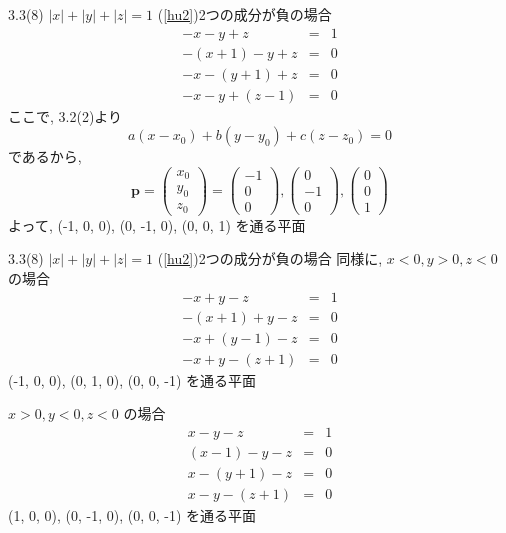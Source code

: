 \documentclass{beamer}
\begin{document}
\begin{frame}{3.3(8) $|x| + |y| + |z|  = 1$ \hspace{5mm} (\ref{hu2})2つの成分が負の場合}
  \begin{eqnarray*}
    -x - y + z &=& 1\\
    -(x+1) - y + z &=& 0\\
    -x - (y+1) + z &=& 0\\
    -x - y + (z-1) &=& 0
  \end{eqnarray*}
  ここで, 3.2(2)より
  \begin{equation*}
    a(x-x_0) + b(y-y_0) + c(z-z_0) = 0
  \end{equation*}
  であるから,
  \begin{equation*}
    \bm{p} = 
    \begin{pmatrix}
      x_0\\
      y_0\\
      z_0
    \end{pmatrix} =
    \begin{pmatrix}
      -1\\
      0\\
      0
    \end{pmatrix} , 
    \begin{pmatrix}
      0\\
      -1\\
      0
    \end{pmatrix} , 
    \begin{pmatrix}
      0\\
      0\\
      1
    \end{pmatrix} 
  \end{equation*}
  よって, (-1, 0, 0), (0, -1, 0), (0, 0, 1) を通る平面
\end{frame}



\begin{frame}{3.3(8) $|x| + |y| + |z|  = 1$ \hspace{5mm} (\ref{hu2})2つの成分が負の場合}
  同様に, $x < 0, y > 0, z < 0$ の場合 
  \begin{eqnarray*}
    -x + y -z &=& 1\\
    -(x+1) + y - z &=& 0\\
    -x + (y-1) - z &=& 0\\
    -x + y - (z+1) &=& 0
  \end{eqnarray*}
  (-1, 0, 0), (0, 1, 0), (0, 0, -1) を通る平面 \\ \vspace{5mm}

  $x > 0, y < 0, z < 0$ の場合 
  \begin{eqnarray*}
    x - y - z &=& 1\\
    (x-1) - y - z &=& 0\\
    x - (y+1) - z &=& 0\\
    x - y - (z+1) &=& 0
  \end{eqnarray*}
  (1, 0, 0), (0, -1, 0), (0, 0, -1) を通る平面
\end{frame}
\end{document}
